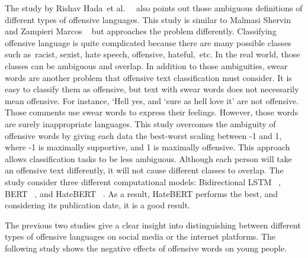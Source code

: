 \documentclass[11pt, natbib=false]{article}
\begin{document}
\begin{multicols}{2}
The study by Rishav Hada et al. ~\cite{hada2021ruddit} also points out those ambiguous definitions of different types of offensive languages.
This study is similar to Malmasi Shervin and Zampieri Marcos ~\cite{malmasi2017detecting} but approaches the problem differently.
Classifying offensive language is quite complicated because there are many possible classes such as racist, sexist, hate speech, offensive, hateful, etc. In the real world, those classes can be ambiguous and overlap.
In addition to those ambiguities, swear words are another problem that offensive text classification must consider.
It is easy to classify them as offensive, but text with swear words does not necessarily mean offensive.
For instance, ‘Hell yes, and ‘sure as hell love it’ are not offensive.
Those comments use swear words to express their feelings.
However, those words are surely inappropriate languages.
This study overcomes the ambiguity of offensive words by giving each data the best-worst scaling between -1 and 1, where -1 is maximally supportive, and 1 is maximally offensive.
This approach allows classification tasks to be less ambiguous.
Although each person will take an offensive text differently, it will not cause different classes to overlap.
The study consider three different computational models: Bidirectional LSTM ~\cite{pennington2014glove}, BERT ~\cite{devlin2018bert}, and HateBERT ~\cite{caselli2020hatebert}.
As a result, HateBERT performs the best, and considering its publication date, it is a good result. 

The previous two studies give a clear insight into distinguishing between different types of offensive languages on social media or the internet platforms.
The following study shows the negative effects of offensive words on young people.


\end{multicols}
\end{document}
